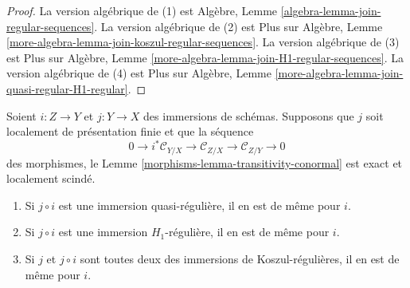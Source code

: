 \begin{proof}
La version algébrique de (1) est Algèbre, Lemme  \ref{algebra-lemma-join-regular-sequences}. La version
algébrique de (2) est Plus sur Algèbre, Lemme  \ref{more-algebra-lemma-join-koszul-regular-sequences}. La version algébrique
de (3) est Plus sur Algèbre, Lemme  \ref{more-algebra-lemma-join-H1-regular-sequences}. La version algébrique de (4) est
Plus sur Algèbre, Lemme  \ref{more-algebra-lemma-join-quasi-regular-H1-regular}.
\end{proof}

\begin{lemma}
\label{lemma-permanence-regular-immersion}
Soient  $i : Z \to Y$  et  $j : Y \to X$  des immersions de schémas. Supposons que
 $j$  soit localement de présentation finie et que la séquence
$$
0 \to i^*\mathcal{C}_{Y/X} \to
\mathcal{C}_{Z/X} \to
\mathcal{C}_{Z/Y} \to 0
$$
des morphismes, le Lemme  \ref{morphisms-lemma-transitivity-conormal}  est exact et localement scindé.
\begin{enumerate}
\item Si  $j \circ i$  est une immersion quasi-régulière, il en est de même pour
 $i$.
\item Si  $j \circ i$  est une immersion  $H_1$-régulière, il en est de même pour
 $i$.
\item Si  $j$  et  $j \circ i$  sont toutes deux des immersions de
Koszul-régulières, il en est de même pour  $i$.
\end{enumerate}
\end{lemma}

